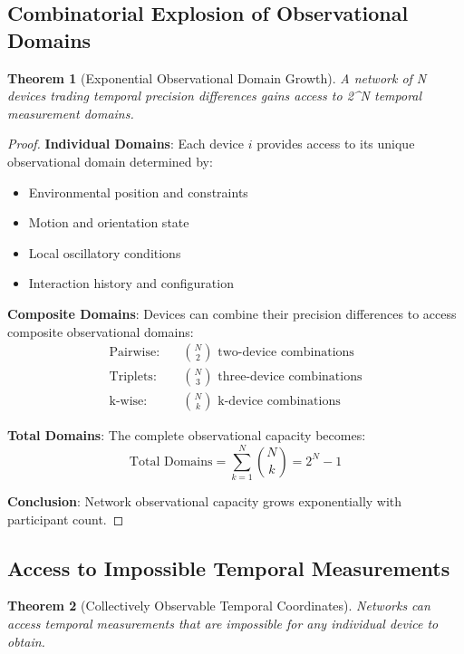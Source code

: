 \documentclass[12pt,a4paper]{article}
\newtheorem{theorem}{Theorem}[section]
\begin{document}
\subsection{Combinatorial Explosion of Observational Domains}

\begin{theorem}[Exponential Observational Domain Growth]
A network of N devices trading temporal precision differences gains access to 2^N temporal measurement domains.
\end{theorem}

\begin{proof}
\textbf{Individual Domains}: Each device $i$ provides access to its unique observational domain determined by:
\begin{itemize}
\item Environmental position and constraints
\item Motion and orientation state
\item Local oscillatory conditions
\item Interaction history and configuration
\end{itemize}

\textbf{Composite Domains}: Devices can combine their precision differences to access composite observational domains:
\begin{align}
\text{Pairwise}: &\quad \binom{N}{2} \text{ two-device combinations} \\
\text{Triplets}: &\quad \binom{N}{3} \text{ three-device combinations} \\
\text{k-wise}: &\quad \binom{N}{k} \text{ k-device combinations}
\end{align}

\textbf{Total Domains}: The complete observational capacity becomes:
$$\text{Total Domains} = \sum_{k=1}^{N} \binom{N}{k} = 2^N - 1$$

\textbf{Conclusion}: Network observational capacity grows exponentially with participant count.
\end{proof}

\subsection{Access to Impossible Temporal Measurements}

\begin{theorem}[Collectively Observable Temporal Coordinates]
Networks can access temporal measurements that are impossible for any individual device to obtain.
\end{theorem}
\end{document}
